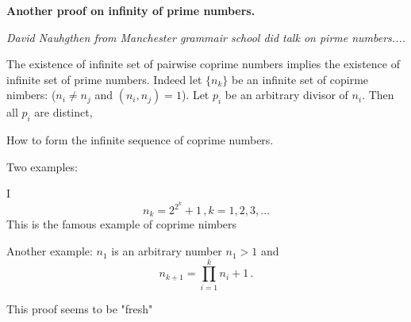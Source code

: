 


\baselineskip=14pt
\def\vare {\varepsilon}
\def\A {{\bf A}}
\def\t {\tilde}
\def\bs {{\bf s}}
\def\a {\alpha}
\def\d {\delta}
\def\K {{\bf K}}
\def\N {{\bf N}}
\def\w {\omega}
\def\s {{\sigma}}
\def\S {{\Sigma}}
\def\s {{\sigma}}
\def\p{\partial}
\def\vare{{\varepsilon}}
\def\Q {{\bf Q}}
\def\D {{\cal D}}
\def\G {{\Gamma}}
\def\C {{\bf C}}
\def\L {{\cal L}}
\def\F {{\cal F}}
\def\Z {{\bf Z}}
\def\U  {{\cal U}}
\def\H {{\bf H}}
\def\R  {{\bf R}}
\def\S  {{\bf S}}
\def\E  {{\bf E}}
\def\l {\lambda}
\def\degree {{\bf {\rm degree}\,\,}}
\def \finish {${\,\,\vrule height1mm depth2mm width 8pt}$}
\def \m {\medskip}
\def\p {\partial}
\def\r {{\bf r}}
\def\pt {{\bf pt}}
\def\v {{\bf v}}
\def\n {{\bf n}}
\def\t {{\bf t}}
\def\b {{\bf b}}
\def\c {{\bf c }}
\def\e{{\bf e}}
\def\ac {{\bf a}}
\def \X   {{\bf X}}
\def \Y   {{\bf Y}}
\def \x   {{\bf x}}
\def \y   {{\bf y}}
\def\ss  {\sigma_{\rm sph}}
\def \grad {{\rm grad\,}}
\def\e {{\bf e}}
\def\f {{\bf f}}

\centerline {\bf Another proof on infinity of prime numbers.}

{\it David Nauhgthen from Manchester grammair school did talk
on pirme numbers....}


  The existence of infinite set of
pairwise coprime numbers implies the existence of 
infinite set of prime numbers.  
Indeed let
     $\{n_k\}$ be an  infinite set of copirme nimbers:
  ($n_i\not=n_j$ and $(n_i,n_j)=1$). Let 
$p_i$ be an arbitrary divisor of $n_i$. Then 
all $p_i$ are distinct,

How to form the infinite sequence of coprime numbers.

   Two examples:


I
     $$
   n_k=2^{2^k}+1\,, k=1,2,3,\dots
      $$
This is the famous example of coprime nimbers

Another example:  $n_1$ is an arbitrary number $n_1>1$ and
       $$
   n_{k+1}=\prod_{i=1}^k n_i+1\,.
       $$


This proof seems to be "fresh"

\bye

